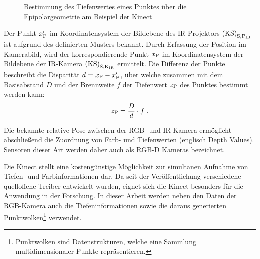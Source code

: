 
\begin{figure}[ht]
	\begin{center}
		\caption{Bestimmung des Tiefenwertes eines Punktes über die Epipolargeometrie am Beispiel der Kinect}
		\label{fig.kinect_depth}
	\end{center}
\end{figure}

\prever{
}

Der Punkt $x_{{\mathrm{P}}}'$ im Koordinatensystem der Bildebene des IR-Projektors ${\mathrm{(KS)}}_{\mathrm{S,P_{IR}}}$ ist aufgrund des definierten Musters bekannt. Durch Erfassung der Position im Kamerabild, wird der korrespondierende Punkt $x_{{\mathrm{P}}}$ im Koordinatensystem der Bildebene der IR-Kamera ${\mathrm{(KS)}}_{\mathrm{S,K_{IR}}}$ ermittelt. Die Differenz der Punkte beschreibt die Disparität $d = x_{\mathrm{P}} - x_{{\mathrm{P}}}'$, über welche zusammen mit dem Basisabstand $D$ und der Brennweite $f$ der Tiefenwert $z_{\mathrm{P}}$ des Punktes bestimmt werden kann:
%
%
%
\begin{equation}
z_{\mathrm{P}} = \frac{D}{d}\cdot f \; \text{.}
\end{equation}

Die bekannte relative Pose zwischen der RGB- und IR-Kamera ermöglicht abschließend die Zuordnung von Farb- und Tiefenwerten (englisch Depth Values). Sensoren dieser Art werden daher auch als RGB-D Kameras bezeichnet.\\


Die Kinect stellt eine kostengünstige Möglichkeit zur simultanen Aufnahme von Tiefen- und Farbinformationen dar. Da seit der Veröffentlichung verschiedene quelloffene Treiber entwickelt wurden, eignet sich die Kinect besonders für die Anwendung in der Forschung. In dieser Arbeit werden neben den Daten der RGB-Kamera auch die Tiefeninformationen sowie die daraus generierten Punktwolken\footnote{Punktwolken sind Datenstrukturen, welche eine Sammlung multidimensionaler Punkte repräsentieren.
} verwendet.

